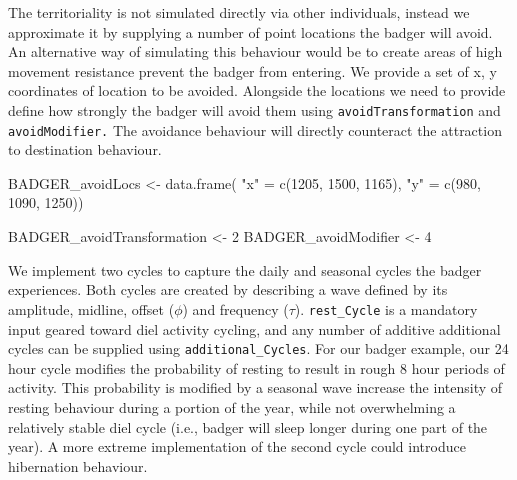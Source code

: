\documentclass[10pt,a4paper]{article}
\newenvironment{Shaded}{}{}
\newcommand{\DecValTok}[1]{#1}
\newcommand{\FunctionTok}[1]{#1}
\newcommand{\NormalTok}[1]{#1}
\newcommand{\OtherTok}[1]{#1}
\newcommand{\StringTok}[1]{#1}
\begin{document}
The territoriality is not simulated directly via other individuals, instead we approximate it by supplying a number of point locations the badger will avoid.
An alternative way of simulating this behaviour would be to create areas of high movement resistance prevent the badger from entering.
We provide a set of x, y coordinates of location to be avoided.
Alongside the locations we need to provide define how strongly the badger will avoid them using \texttt{avoidTransformation} and \texttt{avoidModifier.}
The avoidance behaviour will directly counteract the attraction to destination behaviour.

\begin{Shaded}
\begin{Highlighting}[]
\NormalTok{BADGER\_avoidLocs }\OtherTok{\textless{}{-}} \FunctionTok{data.frame}\NormalTok{(}
  \StringTok{"x"} \OtherTok{=} \FunctionTok{c}\NormalTok{(}\DecValTok{1205}\NormalTok{, }\DecValTok{1500}\NormalTok{, }\DecValTok{1165}\NormalTok{),}
  \StringTok{"y"} \OtherTok{=} \FunctionTok{c}\NormalTok{(}\DecValTok{980}\NormalTok{, }\DecValTok{1090}\NormalTok{, }\DecValTok{1250}\NormalTok{))}

\NormalTok{BADGER\_avoidTransformation }\OtherTok{\textless{}{-}} \DecValTok{2}
\NormalTok{BADGER\_avoidModifier }\OtherTok{\textless{}{-}} \DecValTok{4}
\end{Highlighting}
\end{Shaded}

We implement two cycles to capture the daily and seasonal cycles the badger experiences.
Both cycles are created by describing a wave defined by its amplitude, midline, offset (\(\phi\)) and frequency (\(\tau\)).
\texttt{rest\_Cycle} is a mandatory input geared toward diel activity cycling, and any number of additive additional cycles can be supplied using \texttt{additional\_Cycles}.
For our badger example, our 24 hour cycle modifies the probability of resting to result in rough 8 hour periods of activity.
This probability is modified by a seasonal wave increase the intensity of resting behaviour during a portion of the year, while not overwhelming a relatively stable diel cycle (i.e., badger will sleep longer during one part of the year).
A more extreme implementation of the second cycle could introduce hibernation behaviour.
\end{document}
